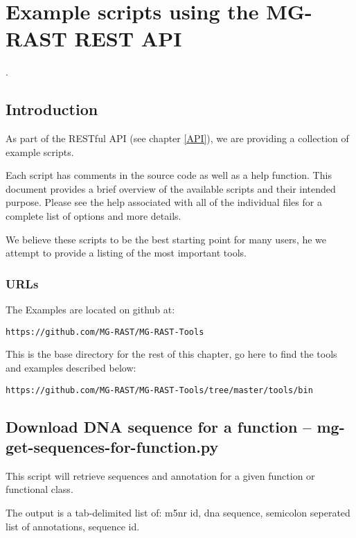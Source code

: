 
\chapter{Example scripts using the MG-RAST REST API}
\label{API-Examples}. %


\section{Introduction}
As part of the RESTful API (see chapter \ref{API}), we are providing a collection of example scripts. 

Each script has comments in the source code as well as a help function. This document provides a brief overview of the available scripts and their intended purpose.  Please see the help associated with all of the individual files for a complete list of options and more details.

We believe these scripts to be the best starting point for many users, he we attempt to provide a listing of the most important tools.


\subsection{URLs}
The Examples are located on github at:
\begin{small}
\begin{verbatim}
https://github.com/MG-RAST/MG-RAST-Tools
\end{verbatim}
This is the base directory for the rest of this chapter, go here to find the tools and examples described below:
\begin{verbatim}
https://github.com/MG-RAST/MG-RAST-Tools/tree/master/tools/bin
\end{verbatim}
\end{small}

\section{Download DNA sequence for a function -- mg-get-sequences-for-function.py}

This script will retrieve sequences and annotation for a given function or functional class.

The output is a tab-delimited list of: m5nr id, dna sequence, semicolon seperated list of annotations, sequence id.

